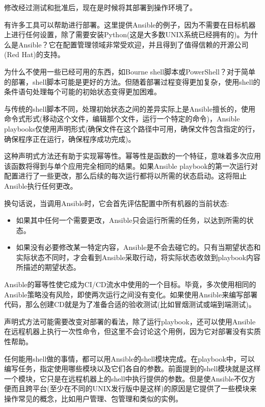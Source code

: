 
修改经过测试和批准后，现在是时候将其部署到操作环境了。

有许多工具可以帮助进行部署。这里提供Ansible的例子，因为不需要在目标机器上进行任何设置，除了需要安装Python(这是大多数UNIX系统已经拥有的)。为什么是Ansible？它在配置管理领域非常受欢迎，并且得到了值得信赖的开源公司(Red Hat)的支持。


为什么不使用一些已经可用的东西，如Bourne shell脚本或PowerShell？对于简单的部署，shell脚本可能是更好的方法。但随着部署过程变得更加复杂，使用shell的条件语句处理每个可能的初始状态变得更加困难。

与传统的shell脚本不同，处理初始状态之间的差异实际上是Ansible擅长的，使用命令式形式(移动这个文件，编辑那个文件，运行一个特定的命令)，Ansible playbooks仅使用声明形式(确保文件在这个路径中可用，确保文件包含指定的行，确保程序正在运行，确保程序成功完成)。

这种声明式方法还有助于实现幂等性。幂等性是函数的一个特征，意味着多次应用该函数将得到与单个应用完全相同的结果。如果Ansible playbook的第一次运行对配置进行了一些更改，那么后续的每次运行都将以所需的状态启动。这将阻止Ansible执行任何更改。

换句话说，当调用Ansible时，它会首先评估配置中所有机器的当前状态:

\begin{itemize}
\item 
如果其中任何一个需要更改，Ansible只会运行所需的任务，以达到所需的状态。

\item 
如果没有必要修改某一特定内容，Ansible是不会去碰它的。只有当期望状态和实际状态不同时，才会看到Ansible采取行动，将实际状态收敛到playbook内容所描述的期望状态。
\end{itemize}


Ansible的幂等性使它成为CI/CD流水中使用的一个目标。毕竟，多次使用相同的Ansible策略没有风险，即使两次运行之间没有变化。如果使用Ansible来编写部署代码，那么创建CD就是为了准备合适的验收测试(比如冒烟测试或端到端测试)。

声明式方法可能需要改变对部署的看法，除了运行playbook，还可以使用Ansible在远程机器上执行一次性命令，但这里不会讨论这个用例，因为它对部署没有实质性帮助。

任何能用shell做的事情，都可以用Ansible的shell模块完成。在playbook中，可以编写任务，指定使用哪些模块以及它们各自的参数。前面提到的shell模块就是这样一个模块，它只是在远程机器上的shell中执行提供的参数。但是使Ansible不仅方便而且跨平台(至少在不同的UNIX发行版中是这样)的原因是它提供了一些模块来操作常见的概念，比如用户管理、包管理和类似的实例。

